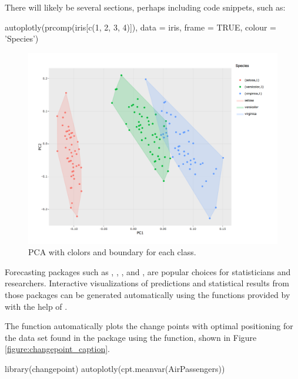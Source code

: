 There will likely be several sections, perhaps including code snippets,
such as:

\begin{Schunk}
\begin{Sinput}
autoplotly(prcomp(iris[c(1, 2, 3, 4)]), data = iris, frame = TRUE, colour = 'Species')
\end{Sinput}
\end{Schunk}

\begin{figure}[htbp]
  \centering
  \includegraphics[width=145mm,scale=0.8]{images/iris_pca_full.png}
  \caption{PCA with clolors and boundary for each class.}
  \label{figure:pca_full}
\end{figure}

Forecasting packages such as  \citep{forecast},
 \citep{changepoint}, 
\citep{strucchange}, and  \citep{dlm}, are popular choices
for statisticians and researchers. Interactive visualizations of
predictions and statistical results from those packages can be generated
automatically using the functions provided by  with the
help of .

The  function automatically plots the change points with
optimal positioning for the  data set found in the
 package using the  function, shown
in Figure \ref{figure:changepoint_caption}.

\begin{Schunk}
\begin{Sinput}
library(changepoint)
autoplotly(cpt.meanvar(AirPassengers))
\end{Sinput}
\end{Schunk}

